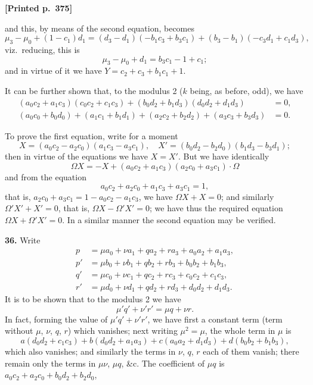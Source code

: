 \documentclass[11pt]{article}
\begin{document}
\medskip
\noindent\textbf{[Printed p.~375]}\hfill

\medskip
and this, by means of the second equation, becomes
\[
\mu_{3}-\mu_{0}+(1-c_{1})d_{1}=(d_{3}-d_{1})(-b_{1}c_{3}+b_{3}c_{1})+(b_{3}-b_{1})(-c_{3}d_{1}+c_{1}d_{3}),
\]
viz.\ reducing, this is
\[
\mu_{3}-\mu_{0}+d_{1}=b_{3}c_{1}-1+c_{1};
\]
and in virtue of it we have $Y=c_{2}+c_{3}+b_{1}c_{1}+1$.

It can be further shown that, to the modulus 2 ($k$ being, as before, odd), we have
\begin{align*}
(a_{0}c_{2}+a_{1}c_{3})(c_{0}c_{2}+c_{1}c_{3})+(b_{0}d_{2}+b_{1}d_{3})(d_{0}d_{2}+d_{1}d_{3}) &= 0,\\
(a_{0}c_{0}+b_{0}d_{0})+(a_{1}c_{1}+b_{1}d_{1})+(a_{2}c_{2}+b_{2}d_{2})+(a_{3}c_{3}+b_{3}d_{3}) &= 0.
\end{align*}

To prove the first equation, write for a moment
\[
X=(a_{0}c_{2}-a_{2}c_{0})(a_{1}c_{3}-a_{3}c_{1}),\quad X'=(b_{0}d_{2}-b_{2}d_{0})(b_{1}d_{3}-b_{3}d_{1});
\]
then in virtue of the equations we have $X=X'$. But we have identically
\[
\Omega X=-X+(a_{0}c_{2}+a_{1}c_{3})(a_{2}c_{0}+a_{3}c_{1})\cdot\Omega
\]
and from the equation
\[
a_{0}c_{2}+a_{2}c_{0}+a_{1}c_{3}+a_{3}c_{1}=1,
\]
that is, $a_{2}c_{0}+a_{3}c_{1}=1-a_{0}c_{2}-a_{1}c_{3}$, we have $\Omega X+X=0$; and similarly $\Omega' X'+X'=0$, that is, $\Omega X-\Omega' X'=0$; we have thus the required equation $\Omega X+\Omega' X'=0$. In a similar manner the second equation may be verified.

\medskip
\noindent\textbf{36.} Write
\begin{align*}
p &= \mu a_{0}+\nu a_{1}+q a_{2}+r a_{3}+a_{0}a_{2}+a_{1}a_{3},\\
p' &= \mu b_{0}+\nu b_{1}+q b_{2}+r b_{3}+b_{0}b_{2}+b_{1}b_{3},\\
q' &= \mu c_{0}+\nu c_{1}+q c_{2}+r c_{3}+c_{0}c_{2}+c_{1}c_{3},\\
r' &= \mu d_{0}+\nu d_{1}+q d_{2}+r d_{3}+d_{0}d_{2}+d_{1}d_{3}.
\end{align*}
It is to be shown that to the modulus 2 we have
\[
\mu' q'+\nu' r'=\mu q+\nu r.
\]
In fact, forming the value of $\mu' q'+\nu' r'$, we have first a constant term (term without $\mu$, $\nu$, $q$, $r$) which vanishes; next writing $\mu^{2}=\mu$, the whole term in $\mu$ is
\[
a(d_{0}d_{2}+c_{1}c_{3})+b(d_{0}d_{2}+a_{1}a_{3})+c(a_{0}a_{2}+d_{1}d_{3})+d(b_{0}b_{2}+b_{1}b_{3}),
\]
which also vanishes; and similarly the terms in $\nu$, $q$, $r$ each of them vanish; there remain only the terms in $\mu\nu$, $\mu q$, \&c. The coefficient of $\mu q$ is $a_{0}c_{2}+a_{2}c_{0}+b_{0}d_{2}+b_{2}d_{0}$,
\end{document}
